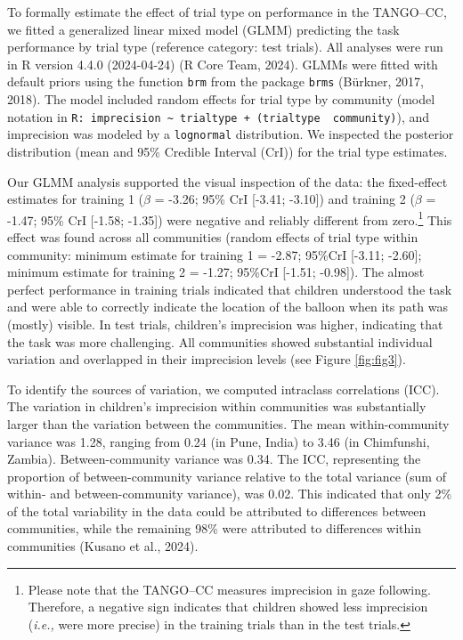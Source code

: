 \documentclass[
  man,floatsintext]{apa7}
\begin{document}
To formally estimate the effect of trial type on performance in the TANGO--CC, we fitted a generalized linear mixed model (GLMM) predicting the task performance by trial type (reference category: test trials).
All analyses were run in R version 4.4.0 (2024-04-24) (R Core Team, 2024).
GLMMs were fitted with default priors using the function \texttt{brm} from the package \texttt{brms} (Bürkner, 2017, 2018).
The model included random effects for trial type by community (model notation in \texttt{R:\ imprecision\ \textasciitilde{}\ trialtype\ +\ (trialtype\ \textbar{}\ community)}), and imprecision was modeled by a \texttt{lognormal} distribution.
We inspected the posterior distribution (mean and 95\% Credible Interval (CrI)) for the trial type estimates.

Our GLMM analysis supported the visual inspection of the data: the fixed-effect estimates for training 1 (\(\beta\) = -3.26; 95\% CrI {[}-3.41; -3.10{]}) and training 2 (\(\beta\) = -1.47; 95\% CrI {[}-1.58; -1.35{]}) were negative and reliably different from zero.\footnote{Please note that the TANGO--CC measures imprecision in gaze following.
  Therefore, a negative sign indicates that children showed less imprecision (\emph{i.e.,} were more precise) in the training trials than in the test trials.}
This effect was found across all communities (random effects of trial type within community: minimum estimate for training 1 = -2.87; 95\%CrI {[}-3.11; -2.60{]}; minimum estimate for training 2 = -1.27; 95\%CrI {[}-1.51; -0.98{]}).
The almost perfect performance in training trials indicated that children understood the task and were able to correctly indicate the location of the balloon when its path was (mostly) visible.
In test trials, children's imprecision was higher, indicating that the task was more challenging.
All communities showed substantial individual variation and overlapped in their imprecision levels (see Figure \ref{fig:fig3}).

To identify the sources of variation, we computed intraclass correlations (ICC).
The variation in children's imprecision within communities was substantially larger than the variation between the communities.
The mean within-community variance was 1.28, ranging from 0.24 (in Pune, India) to 3.46 (in Chimfunshi, Zambia).
Between-community variance was 0.34.
The ICC, representing the proportion of between-community variance relative to the total variance (sum of within- and between-community variance), was 0.02.
This indicated that only 2\% of the total variability in the data could be attributed to differences between communities, while the remaining 98\% were attributed to differences within communities (Kusano et al., 2024).
\end{document}
